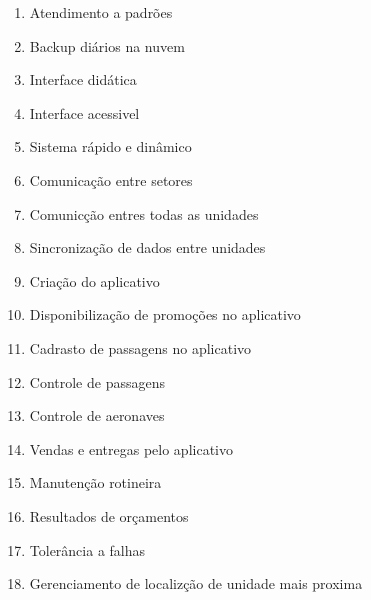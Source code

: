 \begin{enumerate}
  \item Atendimento a padrões
  \item Backup diários na nuvem
  \item Interface didática
  \item Interface acessivel
  \item Sistema rápido e dinâmico
  \item Comunicação entre setores
  \item Comunicção entres todas as unidades
  \item Sincronização de dados entre unidades
  \item Criação do aplicativo
  \item Disponibilização de promoções no aplicativo
  \item Cadrasto de passagens no aplicativo
  \item Controle de passagens
  \item Controle de aeronaves
  \item Vendas e entregas pelo aplicativo
  \item Manutenção rotineira
  \item Resultados de orçamentos
  \item Tolerância a falhas
  \item Gerenciamento de localizção de unidade mais proxima
        
\end{enumerate}



